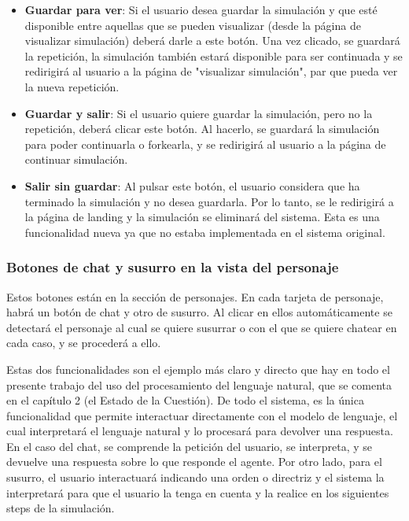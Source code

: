 \begin{itemize}
	
	\item \textbf{Guardar para ver}: Si el usuario desea guardar la simulación y que esté disponible entre aquellas que se pueden visualizar (desde la página de visualizar simulación) deberá darle a este botón. Una vez clicado, se guardará la repetición, la simulación también estará disponible para ser continuada y se redirigirá al usuario a la página de "visualizar simulación", par que pueda ver la nueva repetición.
	
	\item \textbf{Guardar y salir}: Si el usuario quiere guardar la simulación, pero no la repetición, deberá clicar este botón. Al hacerlo, se guardará la simulación para poder continuarla o forkearla, y se redirigirá al usuario a la página de continuar simulación.
	
	\item \textbf{Salir sin guardar}: Al pulsar este botón, el usuario considera que ha terminado la simulación y no desea guardarla. Por lo tanto, se le redirigirá a la página de landing y la simulación se eliminará del sistema. Esta es una funcionalidad nueva ya que no estaba implementada en el sistema original.

\end{itemize}

\subsubsection{Botones de chat y susurro en la vista del personaje}

Estos botones están en la sección de personajes. En cada tarjeta de personaje, habrá un botón de chat y otro de susurro. Al clicar en ellos automáticamente se detectará el personaje al cual se quiere susurrar o con el que se quiere chatear en cada caso, y se procederá a ello.

Estas dos funcionalidades son el ejemplo más claro y directo que hay en todo el presente trabajo del uso del procesamiento del lenguaje natural, que se comenta en el capítulo 2 (el Estado de la Cuestión). De todo el sistema, es la única funcionalidad que permite interactuar directamente con el modelo de lenguaje, el cual interpretará el lenguaje natural y lo procesará para devolver una respuesta. En el caso del chat, se comprende la petición del usuario, se interpreta, y se devuelve una respuesta sobre lo que responde el agente. Por otro lado, para el susurro, el usuario interactuará indicando una orden o directriz y el sistema la interpretará para que el usuario la tenga en cuenta y la realice en los siguientes steps de la simulación.

